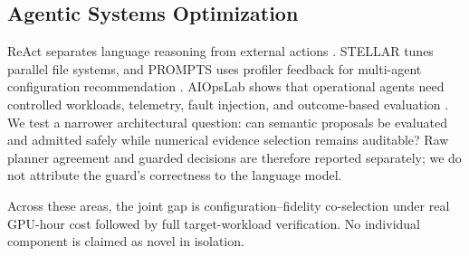\subsection{Agentic Systems Optimization}

ReAct separates language reasoning from external actions \cite{yao2023react}.
STELLAR tunes parallel file systems, and PROMPTS uses profiler feedback for
multi-agent configuration recommendation
\cite{egersdoerfer2025stellar,ding2026prompts}.  AIOpsLab shows
that operational agents need controlled workloads, telemetry, fault injection,
and outcome-based evaluation \cite{chen2025aiopslab}.  We test a narrower
architectural question: can semantic proposals be evaluated and admitted
safely while numerical evidence selection remains auditable?  Raw planner
agreement and guarded decisions are therefore reported separately; we do not
attribute the guard's correctness to the language model.

Across these areas, the joint gap is configuration--fidelity co-selection under
real GPU-hour cost followed by full target-workload verification.  No individual
component is claimed as novel in isolation.
